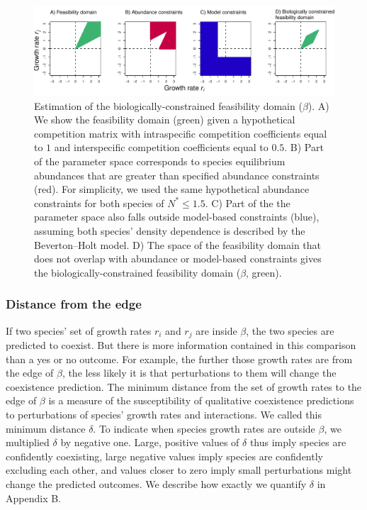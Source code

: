 \begin{figure}[H]
  \centerline{\includegraphics[width=1\textwidth]{figures/chapter3_fig1.pdf}}
  \caption[Estimation of the biologically-constrained feasibility domain]{Estimation of the biologically-constrained feasibility domain ($\beta$). A) We show the feasibility domain (green) given a hypothetical competition matrix with intraspecific competition coefficients equal to $1$ and interspecific competition coefficients equal to $0.5$. B) Part of the parameter space corresponds to species equilibrium abundances that are greater than specified abundance constraints (red). For simplicity, we used the same hypothetical abundance constraints for both species of $N^* \le 1.5$. C) Part of the the parameter space also falls outside model-based constraints (blue), assuming both species' density dependence is described by the Beverton--Holt model. D) The space of the feasibility domain that does not overlap with abundance or model-based constraints gives the biologically-constrained feasibility domain ($\beta$, green). }
  \label{fig:domain}
\end{figure}


\subsubsection*{Distance from the edge}

If two species' set of growth rates $r_{i}$ and $r_{j}$ are inside $\beta$, the two species are predicted to coexist. But there is more information contained in this comparison than a yes or no outcome. For example, the further those growth rates are from the edge of $\beta$, the less likely it is that perturbations to them will change the coexistence prediction. The minimum distance from the set of growth rates to the edge of $\beta$ is a measure of the susceptibility of qualitative coexistence predictions to perturbations of species' growth rates and interactions. We called this minimum distance $\delta$. To indicate when species growth rates are outside $\beta$, we multiplied $\delta$ by negative one. Large, positive values of $\delta$  thus imply species are confidently coexisting, large negative values imply species are confidently excluding each other, and values closer to zero imply small perturbations might change the predicted outcomes. We describe how exactly we quantify $\delta$ in Appendix B.


